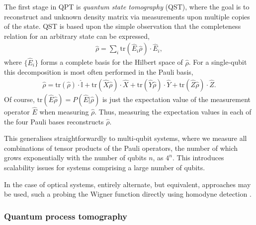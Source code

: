 \documentclass[aps, rmp, twocolumn, amsmath, amssymb, nofootinbib, superscriptaddress, longbibliography, floatfix, table-of-contents, eqsecnum]{revtex4-1}
\begin{document}
The first stage in QPT is \textit{quantum state tomography} (QST), where the goal is to reconstruct and unknown density matrix via measurements upon multiple copies of the state. QST is based upon the simple observation that the completeness relation for an arbitrary state can be expressed,
\begin{align}
\hat\rho = \sum_i \text{tr}(\hat{E}_i\hat\rho)\cdot\hat{E}_i,
\end{align}
where $\{\hat{E}_i\}$ forms a complete basis for the Hilbert space of $\hat\rho$. For a single-qubit this decomposition is most often performed in the Pauli basis, 
\begin{align}
\hat\rho = \text{tr}(\hat\rho)\cdot\hat{\mathbb{I}} + \text{tr}(\hat{X}\hat\rho)\cdot\hat{X} + \text{tr}(\hat{Y}\hat\rho)\cdot\hat{Y} +\text{tr}(\hat{Z}\hat\rho)\cdot\hat{Z}.
\end{align}
Of course, \mbox{$\text{tr}(\hat{E}\hat\rho) = P(\hat{E}|\hat\rho)$} is just the expectation value of the measurement operator $\hat{E}$ when measuring $\hat\rho$. Thus, measuring the expectation values in each of the four Pauli bases reconstructs $\hat\rho$.

This generalises straightforwardly to multi-qubit systems, where we measure all combinations of tensor products of the Pauli operators, the number of which grows exponentially with the number of qubits $n$, as $4^n$. This introduces scalability issues for systems comprising a large number of qubits.

In the case of optical systems, entirely alternate, but equivalent, approaches may be used, such a probing the Wigner function directly using homodyne detection \cite{???}.

%
%

\subsubsection{Quantum process tomography} 
\end{document}
